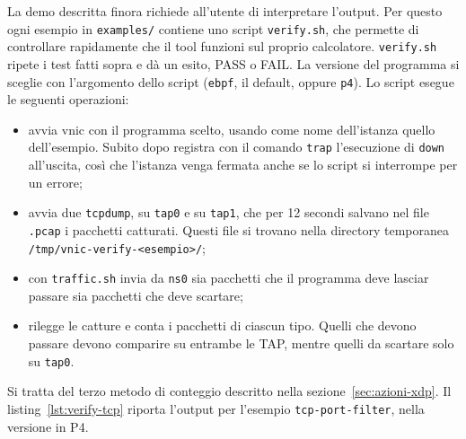 La demo descritta finora richiede all'utente di interpretare l'output. Per questo ogni esempio in \texttt{examples/} contiene uno script \texttt{verify.sh}, che permette di controllare rapidamente che il tool funzioni sul proprio calcolatore.
\texttt{verify.sh} ripete i test fatti sopra e dà un esito, PASS o FAIL. La versione del programma si sceglie con l'argomento dello script (\texttt{ebpf}, il default, oppure \texttt{p4}). Lo script esegue le seguenti operazioni:
\begin{itemize}
    \item avvia vnic con il programma scelto, usando come nome dell'istanza quello dell'esempio. Subito dopo registra con il comando \texttt{trap} l'esecuzione di \texttt{down} all'uscita, così che l'istanza venga fermata anche se lo script si interrompe per un errore;
    \item avvia due \texttt{tcpdump}, su \texttt{tap0} e su \texttt{tap1}, che per 12 secondi salvano nel file \texttt{.pcap} i pacchetti catturati. Questi file si trovano nella directory temporanea \texttt{/tmp/vnic-verify-<esempio>/};
    \item con \texttt{traffic.sh} invia da \texttt{ns0} sia pacchetti che il programma deve lasciar passare sia pacchetti che deve scartare;
    \item rilegge le catture e conta i pacchetti di ciascun tipo. Quelli che devono passare devono comparire su entrambe le TAP, mentre quelli da scartare solo su \texttt{tap0}.
\end{itemize}

Si tratta del terzo metodo di conteggio descritto nella sezione~\ref{sec:azioni-xdp}. Il listing~\ref{lst:verify-tcp} riporta l'output per l'esempio \texttt{tcp-port-filter}, nella versione in P4.

